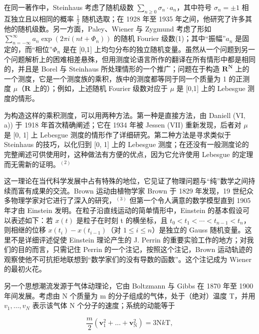 在同一著作中，Steinhaus 考虑了随机级数 \(\sum_{n\geqslant 0}\sigma_n\cdot a_n\)，其中符号 \(\sigma_{n} = \pm 1\) 相互独立且以相同的概率 \(\frac{1}{2}\) 随机选取；在 1928 年至 1935 年之间，他研究了许多其他的随机级数。另一方面，Paley、Wiener 与 Zygmund 考虑了形如 \(\sum_{n = -\infty}^{\infty}a_n\exp (2\pi i(nt + \Phi_n))\) 的随机 Fourier 级数(1)；其中“振幅”\(a_{n}\) 是固定的，而“相位”\(\Phi_{n}\) 是在 {[}0,1{]} 上均匀分布的独立随机变量。虽然从一个问题到另一个问题解析上的困难相差悬殊，但用测度论语言所作的翻译在所有情形中都是相同的，并且是 Borel 与 Steinhaus 所处理情形的一个推广；问题在于构造 \(\mathbf{R}^{\mathbf{N}}\) 上的一个测度，它是一个测度族的乘积，族中的测度都等同于同一个质量为 1 的正测度 \(\mu\)（\(\mathbf{R}\) 上的）；例如，上述随机 Fourier 级数对应于 \(\mu\) 是 {[}0,1{]} 上的 Lebesgue 测度的情形。

为构造这样的乘积测度，可以用两种方法。第一种是直接方法，由 Daniell (VI, a)) 于 1918 年首次精确阐述；它在 1934 年被 Jessen (VII) 重新发现，后者对 \(\mu\) 是 {[}0, 1{]} 上 Lebesgue 测度的情形作了详细研究。第二种方法是寻求类似于 Steinhaus 的技巧，以化归到 {[}0, 1{]} 上的 Lebesgue 测度；在还没有一般测度论的完整阐述可供使用时，这种做法有方便的优点，因为它允许使用 Lebesgue 的定理而无需新的证明。\(^{(2)}\)


这一理论在当代科学发展中占有特殊的地位，它见证了物理问题与“纯”数学之间持续而富有成果的交流。Brown 运动由植物学家 Brown 于 1829 年发现，19 世纪众多物理学家对它进行了深入的研究，\(^{(3)}\) 但第一个令人满意的数学模型直到 1905 年才由 Einstein 发明。在粒子沿直线运动的简单情形中，Einstein 的基本假设可以表述如下：若 \(x(t)\) 是粒子在时刻 t 的横坐标，且 \(t_{0} < t_{1} < \cdots < t_{n-1} < t_{n}\)，则相继的位移 \(x(t_{i}) - x(t_{i-1})\)（对 \(1 \leqslant i \leqslant n\)）是独立的 Gauss 随机变量。这里不是详细评述促使 Einstein 理论产生的 J. Perrin 的重要实验工作的地方；对我们的目的而言，只需记住 Perrin 的一个注记，按照这个注记，Brown 运动轨迹的观察使他不可抗拒地联想到“数学家们的没有导数的函数”。这个注记成为 Wiener 的最初火花。

另一个思想潮流发源于气体动理论，它由 Boltzmann 与 Gibbs 在 1870 年至 1900 年间发展。考虑由 N 个质量为 m 的分子组成的气体，处于（绝对）温度 T，并用 \(v_{1},\ldots,v_{N}\) 表示该气体 N 个分子的速度；系统的动能等于

\[
\frac {m}{2} (\mathbf {v} _ {1} ^ {2} + \dots + \mathbf {v} _ {\mathrm{N}} ^ {2}) = 3 \mathrm{N} k \mathrm{T},\tag{1}
\]

